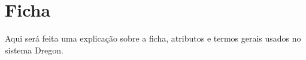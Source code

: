 


\chapter{Ficha}
\label{Cap:Ficha}

Aqui será feita uma explicação sobre a ficha, atributos e termos gerais usados no sistema Dregon.

